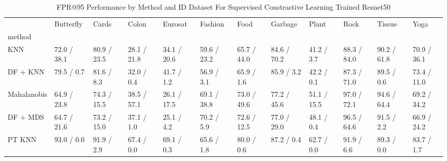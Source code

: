 \documentclass[letterpaper]{article} %
\theoremstyle{plain}
\theoremstyle{definition}
\theoremstyle{remark}
\begin{document}
\begin{table}
\caption{FPR@95 Performance by Method and ID Dataset For Supervised Constrastive Learning Trained Resnet50}

\label{tab:fpr95_results_simclr}
\begin{tabular}{llllllllllll}
\toprule
 & Butterfly & Cards & Colon & Eurosat & Fashion & Food & Garbage & Plant & Rock & Tissue & Yoga \\
method &  &  &  &  &  &  &  &  &  &  &  \\
\midrule
KNN & 72.0 / 38.1 & 80.9 / 23.5 & 28.1 / 21.8 & 34.1 / 20.6 & 59.6 / 23.2 & 65.7 / 44.0 & 84.6 / 70.2 & 41.2 / 3.7 & 88.3 / 84.0 & 90.2 / 61.8 & 70.9 / 36.1 \\
DF + KNN & 79.5 / 0.7 & 81.6 / 8.3 & 32.0 / 0.4 & 41.7 / 1.2 & 56.9 / 3.1 & 65.9 / 1.6 & 85.9 / 3.2 & 42.2 / 0.1 & 87.3 / 71.0 & 89.5 / 0.6 & 73.4 / 11.0 \\
Mahalanobis & 64.9 / 23.8 & 74.3 / 15.5 & 38.5 / 57.1 & 26.1 / 17.5 & 69.1 / 38.8 & 73.0 / 49.6 & 77.2 / 45.6 & 51.1 / 15.5 & 97.0 / 72.1 & 94.6 / 64.4 & 69.2 / 34.2 \\
DF + MDS & 64.7 / 21.6 & 73.2 / 15.0 & 37.1 / 1.0 & 25.1 / 4.2 & 70.2 / 5.9 & 72.6 / 12.5 & 77.0 / 29.0 & 48.1 / 0.4 & 96.5 / 64.6 & 91.5 / 2.2 & 66.9 / 24.2 \\
PT KNN & 93.0 / 0.0 & 91.9 / 2.9 & 67.4 / 0.0 & 69.1 / 0.3 & 65.6 / 1.8 & 80.0 / 0.6 & 87.2 / 0.4 & 62.7 / 0.0 & 91.9 / 6.6 & 89.3 / 0.0 & 83.7 / 1.7 \\
\bottomrule
\end{tabular}

\end{table}
\end{document}

